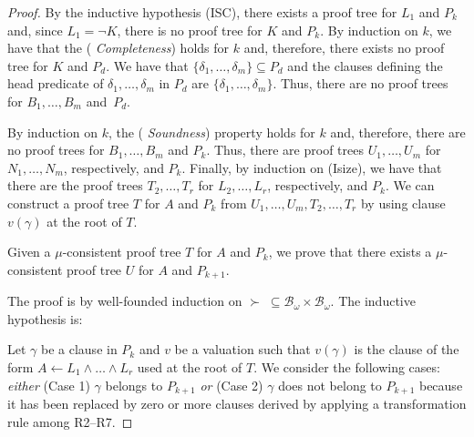 \documentclass[english]{tlp}
\begin{document}
\begin{proof}
By the inductive hypothesis (ISC), there exists a proof tree for
$L_1$ and $P_k$ and, since $L_1=\neg K$, there is no
proof tree for $K$ and $ P_{k}$. By induction on $k$, we have
that the ({\em
Completeness}) holds for $k$ and, therefore, there exists no proof
tree for $K$ and $ P_d$. We have that
$\{\delta_1,\ldots,\delta_m\}\subseteq P_d$ and the clauses defining
the head predicate of $\delta_1,\ldots,\delta_m$ in $ P_{d}$ are
$\{\delta_1,\ldots,\delta_m\}$. Thus, there are no proof trees for
$B_1,\ldots, B_m$ and~$P_d$. 

By induction on $k$,  the ({\em
Soundness}) property holds for $k$ and, therefore, there are no
proof trees for $B_1,\ldots, B_m$ and $ P_k$. Thus, there are proof
trees $U_1,\ldots,U_m$ for $N_1,\ldots,N_m$, respectively,  and $ P_k$. Finally, by
induction on (Isize), we have that there are the proof trees
$T_2,\ldots,T_r$ for $L_2,\ldots,L_r$, respectively, and $ P_{k}$.
We can construct a proof tree $T$ for $A$ and $ P_k$ from
$U_1,\ldots,U_m,T_2,\ldots,T_r$ by using clause $v(\gamma)$
 at the root of $T$.

\medskip{}

 Given a \(\mu \)-consistent proof
tree $T$ for \( A \) and \(  P_{k} \), we prove that there exists a
\( \mu \)-consistent proof tree $U$ for \( A \) and \(
 P_{k+1} \).

The proof is by well-founded induction on 
$\succ\; \subseteq \mathcal{B}_{\omega}\!\times\! \mathcal{B}_{\omega}$. The
inductive hypothesis is:

\medskip{}

\noindent
{}



\medskip{}

Let \( \gamma  \) be a clause in \(  P_{k} \) and \( v \) be a
valuation such that \( v(\gamma) \) is the clause of the form \(
A\leftarrow L_{1}\wedge \ldots \wedge L_{r} \) used at the root of
\( T \). We consider the following cases: \emph{either} (Case 1) \(
\gamma \) belongs to \(  P_{k+1} \) \emph{or} (Case 2) \( \gamma \)
does not belong to \(  P_{k+1} \) because it has been replaced by
zero or more clauses derived by applying a transformation rule among
R2--R7.


\end{proof}
\end{document}
